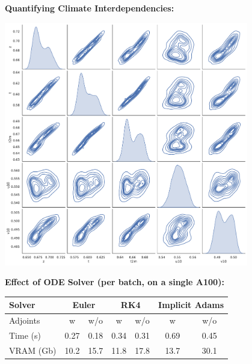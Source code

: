 \documentclass[landscape,a1paper,fontscale=0.424]{baposter}
\begin{document}
\begin{poster}
{\begin{minipage}[t]{0.50\textwidth}
            \textbf{\color{blue}Quantifying Climate Interdependencies:}
            \vspace{-0.5em}
            \begin{center}
                \includegraphics[width=0.8\textwidth]{pairwise.pdf}
            \end{center}
        \end{minipage}


         \textbf{\color{blue}Effect of ODE Solver (per batch, on a single A100):}
         \vspace{-1.0em}
         \begin{minipage}[t]{0.23\textwidth}
             \begin{tabular}{|l||c|c|c|c|c|c|}
                 \hline
                 Solver & \multicolumn{2}{c|}{Euler} & \multicolumn{2}{c|}{RK4} & \multicolumn{2}{c|}{Implicit Adams} \\
                 \hline
                 Adjoints & w & w/o & w & w/o & w & w/o \\
                 \hline\hline
                 Time (s) & 0.27 & 0.18 & 0.34 & 0.31 & 0.69 & 0.45 \\ \hline
                 VRAM (Gb) & 10.2 & 15.7 & 11.8 & 17.8 & 13.7 & 30.1 \\
                 \hline
             \end{tabular}


\end{minipage}}
\end{poster}
\end{document}

